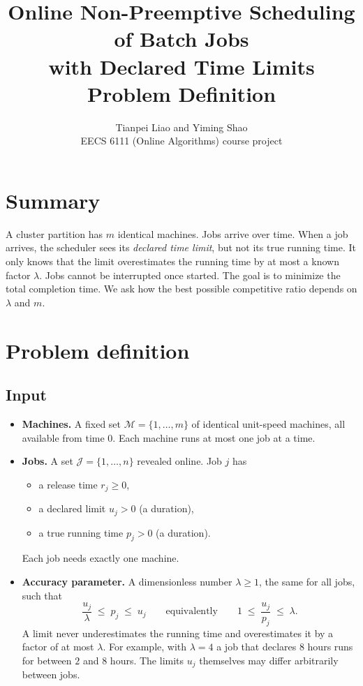 \documentclass[11pt]{article}
\title{Online Non-Preemptive Scheduling of Batch Jobs\\with Declared Time Limits\\[4pt]
\large Problem Definition}
\author{Tianpei Liao and Yiming Shao\\[2pt]EECS 6111 (Online Algorithms) course project}
\date{}
\begin{document}
\maketitle

\section{Summary}

A cluster partition has $m$ identical machines. Jobs arrive over time. When a job arrives, the
scheduler sees its \emph{declared time limit}, but not its true running time. It only knows that the
limit overestimates the running time by at most a known factor $\lambda$. Jobs cannot be interrupted
once started. The goal is to minimize the total completion time. We ask how the best possible
competitive ratio depends on $\lambda$ and $m$.

\section{Problem definition}

\subsection{Input}

\begin{itemize}
  \item \textbf{Machines.} A fixed set $\mathcal{M}=\{1,\dots,m\}$ of identical unit-speed machines,
        all available from time $0$. Each machine runs at most one job at a time.
  \item \textbf{Jobs.} A set $\mathcal{J}=\{1,\dots,n\}$ revealed online. Job $j$ has
        \begin{itemize}
          \item a release time $r_j\ge 0$,
          \item a declared limit $u_j>0$ (a duration),
          \item a true running time $p_j>0$ (a duration).
        \end{itemize}
        Each job needs exactly one machine.
  \item \textbf{Accuracy parameter.} A dimensionless number $\lambda\ge 1$, the same for all jobs,
        such that
        \begin{equation}\label{eq:lambda}
          \frac{u_j}{\lambda}\;\le\;p_j\;\le\;u_j
          \qquad\text{equivalently}\qquad
          1\;\le\;\frac{u_j}{p_j}\;\le\;\lambda .
        \end{equation}
        A limit never underestimates the running time and overestimates it by a factor of at most
        $\lambda$. For example, with $\lambda=4$ a job that declares $8$ hours runs for between $2$
        and $8$ hours. The limits $u_j$ themselves may differ arbitrarily between jobs.
\end{itemize}
\end{document}
